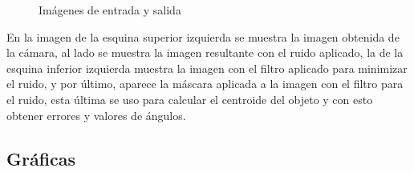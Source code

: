\documentclass[12pt, oneside]{article}
\begin{document}
{\begin{figure}[h!]
        \caption{\sffamily Imágenes de entrada y salida}
        \label{fig:imagenes}
    \end{figure}

    \hspace{0.5cm} En la imagen de la esquina superior izquierda se muestra la imagen
    obtenida de la cámara, al lado se muestra la imagen resultante con el ruido
    aplicado, la de la esquina inferior izquierda muestra la imagen con el filtro
    aplicado para minimizar el ruido, y por último, aparece la máscara aplicada a la
    imagen con el filtro para el ruido, esta última se uso para calcular el centroide
    del objeto y con esto obtener errores y valores de ángulos.

}

\newpage
\subsection{Gráficas}
\end{document}
